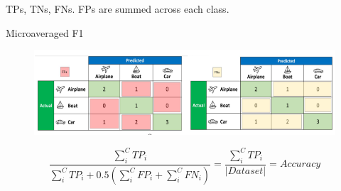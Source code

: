 \documentclass[11pt]{article}
\begin{document}
TPs, TNs,  FNs. FPs are summed across each class.

Microaveraged F1

\begin{figure}[H]
    \centering
    \includegraphics[width=.6\linewidth]{figures/f1.png}    
\end{figure}

\begin{equation*}
    \frac{\sum^C_i TP_i}{\sum^C_i TP_i + 0.5 (\sum^C_i FP_i + \sum^C_i FN_i)} = \frac{\sum^C_i TP_i}{|Dataset|} = Accuracy
\end{equation*}
\end{document}
